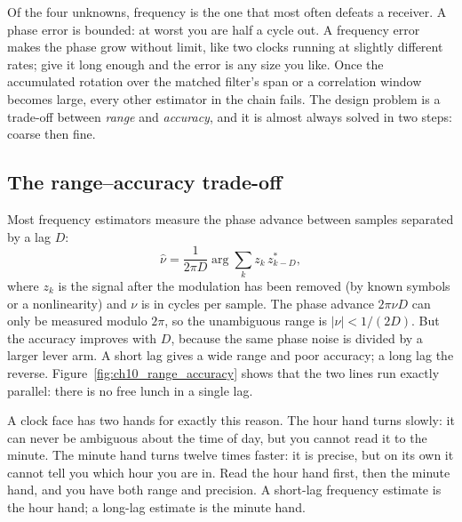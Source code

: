 Of the four unknowns, frequency is the one that most often defeats a receiver. A phase error is
bounded: at worst you are half a cycle out. A frequency error makes the phase grow without limit,
like two clocks running at slightly different rates; give it long enough and the error is any size
you like. Once the accumulated rotation over the matched filter's span or a correlation window
becomes large, every other estimator in the chain fails. The design problem is a trade-off between
\emph{range} and \emph{accuracy}, and it is almost always solved in two steps: coarse then fine.

\subsection{The range--accuracy trade-off}

Most frequency estimators measure the phase advance between samples separated by a lag $D$:
\begin{equation}
\hat\nu=\frac{1}{2\pi D}\arg\sum_k z_k\,z_{k-D}^*,
\label{eq:ch10:delaymult}
\end{equation}
where $z_k$ is the signal after the modulation has been removed (by known symbols or a nonlinearity)
and $\nu$ is in cycles per sample. The phase advance $2\pi\nu D$ can only be measured modulo $2\pi$, so
the unambiguous range is $|\nu|<1/(2D)$. But the accuracy improves with $D$, because the same phase
noise is divided by a larger lever arm. A short lag gives a wide range and poor accuracy; a long lag
the reverse. Figure~\ref{fig:ch10_range_accuracy} shows that the two lines run exactly parallel:
there is no free lunch in a single lag.


\begin{analogy}
A clock face has two hands for exactly this reason. The hour hand turns slowly: it can never be
ambiguous about the time of day, but you cannot read it to the minute. The minute hand turns twelve
times faster: it is precise, but on its own it cannot tell you which hour you are in. Read the hour
hand first, then the minute hand, and you have both range and precision. A short-lag frequency
estimate is the hour hand; a long-lag estimate is the minute hand.
\end{analogy}

